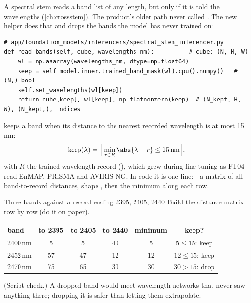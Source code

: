 A spectral stem reads a band list of any length, but only if it is told the wavelengths (\cref{ch:crossstem}). The
product's older path never called . The new helper does that and drops the bands the model has
never trained on:

\begin{lstlisting}
# app/foundation_models/inferencers/spectral_stem_inferencer.py
def read_bands(self, cube, wavelengths_nm):          # cube: (N, H, W)
    wl = np.asarray(wavelengths_nm, dtype=np.float64)
    keep = self.model.inner.trained_band_mask(wl).cpu().numpy()   # (N,) bool
    self.set_wavelengths(wl[keep])
    return cube[keep], wl[keep], np.flatnonzero(keep)  # (N_kept, H, W), (N_kept,), indices
\end{lstlisting}

 keeps a band when its distance to the nearest recorded wavelength is at most 15\,nm:
\begin{equation}
\text{keep}(\lambda) = \Big[\min_{r \in R} \abs{\lambda - r} \le 15\,\text{nm}\Big], \label{eq:shipping:keep}
\end{equation}
with $R$ the trained-wavelength record (), which grew during fine-tuning as FT04 read EnMAP, PRISMA and
AVIRIS-NG. In code it is one line:  -
a matrix of all band-to-record distances, shape , then the minimum along each row.

\begin{worked}[label={we:shipping:keep}]{Three bands against a record ending 2395, 2405, 2440}
Build the distance matrix row by row (do it on paper).
\begin{center}
\begin{tabular}{lccccc}
\toprule
band & to 2395 & to 2405 & to 2440 & minimum & keep? \\
\midrule
2400\,nm & 5 & 5 & 40 & 5 & $5 \le 15$: keep \\
2452\,nm & 57 & 47 & 12 & 12 & $12 \le 15$: keep \\
2470\,nm & 75 & 65 & 30 & 30 & $30 > 15$: drop \\
\bottomrule
\end{tabular}
\end{center}
(Script check\tagC.) A dropped band would meet wavelength networks that never saw anything there; dropping it is safer
than letting them extrapolate.
\end{worked}

